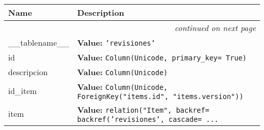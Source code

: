     \vspace{-1cm}
\hspace{\varindent}\begin{longtable}{|p{\varnamewidth}|p{\vardescrwidth}|l}
\cline{1-2}
\cline{1-2} \centering \textbf{Name} & \centering \textbf{Description}& \\
\cline{1-2}
\endhead\cline{1-2}\multicolumn{3}{r}{\small\textit{continued on next page}}\\\endfoot\cline{1-2}
\endlastfoot\raggedright \_\-\_\-t\-a\-b\-l\-e\-n\-a\-m\-e\-\_\-\_\- & \raggedright \textbf{Value:} 
{\tt 'revisiones'}&\\
\cline{1-2}
\raggedright i\-d\- & \raggedright \textbf{Value:} 
{\tt Column(Unicode, primary\_key= True)}&\\
\cline{1-2}
\raggedright d\-e\-s\-c\-r\-i\-p\-c\-i\-o\-n\- & \raggedright \textbf{Value:} 
{\tt Column(Unicode)}&\\
\cline{1-2}
\raggedright i\-d\-\_\-i\-t\-e\-m\- & \raggedright \textbf{Value:} 
{\tt Column(Unicode, ForeignKey("items.id", "items.version"))}&\\
\cline{1-2}
\raggedright i\-t\-e\-m\- & \raggedright \textbf{Value:} 
{\tt relation("Item", backref= backref('revisiones', cascade= \texttt{...}}&\\
\cline{1-2}
\end{longtable}

